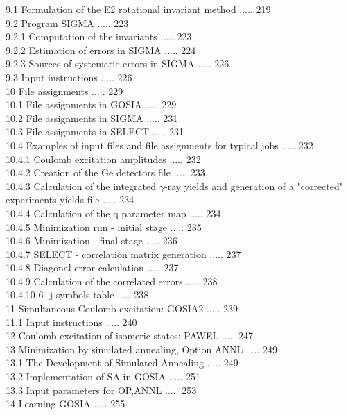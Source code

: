 \documentclass[10pt]{article}
\begin{document}
9.1 Formulation of the E2 rotational invariant method ..... 219\\
9.2 Program SIGMA ..... 223\\
9.2.1 Computation of the invariants ..... 223\\
9.2.2 Estimation of errors in SIGMA ..... 224\\
9.2.3 Sources of systematic errors in SIGMA ..... 226\\
9.3 Input instructions ..... 226\\
10 File assignments ..... 229\\
10.1 File assignments in GOSIA ..... 229\\
10.2 File assignments in SIGMA ..... 231\\
10.3 File assignments in SELECT ..... 231\\
10.4 Examples of input files and file assignments for typical jobs ..... 232\\
10.4.1 Coulomb excitation amplitudes ..... 232\\
10.4.2 Creation of the Ge detectors file ..... 233\\
10.4.3 Calculation of the integrated $\gamma$-ray yields and generation of a "corrected" experiments yields file ..... 234\\
10.4.4 Calculation of the q parameter map ..... 234\\
10.4.5 Minimization run - initial stage ..... 235\\
10.4.6 Minimization - final stage ..... 236\\
10.4.7 SELECT - correlation matrix generation ..... 237\\
10.4.8 Diagonal error calculation ..... 237\\
10.4.9 Calculation of the correlated errors ..... 238\\
10.4.10 6 -j symbols table ..... 238\\
11 Simultaneous Coulomb excitation: GOSIA2 ..... 239\\
11.1 Input instructions ..... 240\\
12 Coulomb excitation of isomeric states: PAWEL ..... 247\\
13 Minimization by simulated annealing, Option ANNL ..... 249\\
13.1 The Development of Simulated Annealing ..... 249\\
13.2 Implementation of SA in GOSIA ..... 251\\
13.3 Input parameters for OP,ANNL ..... 253\\
14 Learning GOSIA ..... 255\\
\end{document}
